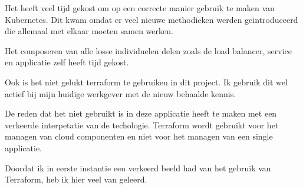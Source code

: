 {{{			Het heeft veel tijd gekost om op een correcte manier gebruik te maken van Kubernetes.
			Dit kwam omdat er veel nieuwe methodieken werden geintroduceerd die allemaal met elkaar moeten samen werken.

			Het composeren van alle losse individuelen delen zoals de load balancer, service en applicatie zelf heeft tijd gekost.

			Ook is het niet gelukt terraform te gebruiken in dit project.
			Ik gebruik dit wel actief bij mijn huidige werkgever met de nieuw behaalde kennis.


			De reden dat het niet gebruikt is in deze applicatie heeft te maken met een verkeerde interpetatie van de techologie.
			Terraform wordt gebruikt voor het managen van cloud componenten en niet voor het managen van een single applicatie.

			Doordat ik in eerste instantie een verkeerd beeld had van het gebruik van Terraform, heb ik hier veel van geleerd.
		}

}}
